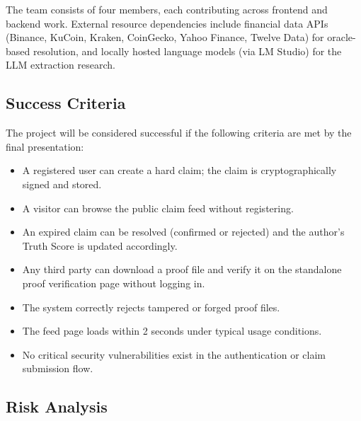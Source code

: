\documentclass[a4paper,12pt]{report}
\begin{document}
The team consists of four members, each contributing across frontend and backend work. External resource dependencies include financial data APIs (Binance, KuCoin, Kraken, CoinGecko, Yahoo Finance, Twelve Data) for oracle-based resolution, and locally hosted language models (via LM Studio) for the LLM extraction research.

\subsection{Success Criteria}

The project will be considered successful if the following criteria are met by the final presentation:

\begin{itemize}
    \item A registered user can create a hard claim; the claim is cryptographically signed and stored.
    \item A visitor can browse the public claim feed without registering.
    \item An expired claim can be resolved (confirmed or rejected) and the author's Truth Score is updated accordingly.
    \item Any third party can download a proof file and verify it on the standalone proof verification page without logging in.
    \item The system correctly rejects tampered or forged proof files.
    \item The feed page loads within 2 seconds under typical usage conditions.
    \item No critical security vulnerabilities exist in the authentication or claim submission flow.
\end{itemize}

\subsection{Risk Analysis}
\end{document}
